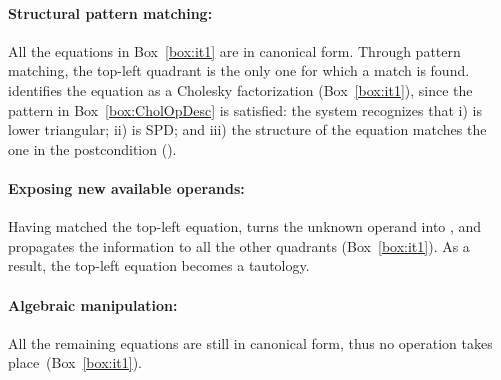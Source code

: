 \documentclass{llncs}
\newcommand{\unknown}[1]{\textcolor{unknown}{#1}}
\newcommand{\click}{{\sc{Cl\makebox[.58\width][c]{1}ck}}}
\begin{document}
\begin{mybox}
{\paragraph{\bf Structural pattern matching:} 
All the equations in Box~\ref{box:it1} are in canonical form.
Through pattern matching, the top-left quadrant is the only one for which a match is found. 
\click{} identifies the equation as a Cholesky factorization (Box~\ref{box:it1}),
since the pattern in Box~\ref{box:CholOpDesc} is satisfied: the system recognizes that 
i)  is lower triangular;
ii)  is SPD; and 
iii) the structure of the equation matches the one in the postcondition ().

\paragraph{\bf Exposing new available operands:} 
Having matched the top-left equation, \click{}
turns the unknown operand \unknown{}
into \known{}, and propagates the information to all the other quadrants
(Box~\ref{box:it1}).
As a result, the top-left equation becomes a tautology.

\paragraph{\bf Algebraic manipulation:} 
All the remaining equations are still in canonical form,
 thus no operation takes place~(Box~\ref{box:it1}).

\begin{mybox} \centering
\tiny
\renewcommand{\arraystretch}{1.6}
\hspace{-.1cm}
\\\vspace{1em}
\hspace{-.1cm}
\hspace{.50cm}
\end{mybox}}
\end{mybox}
\end{document}
